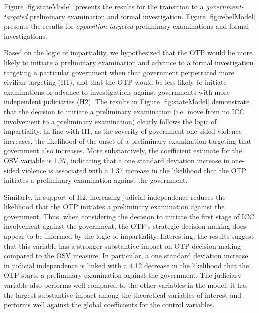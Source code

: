 Figure \ref{fig:stateModel} presents the results for the transition to a \textit{government-targeted} preliminary examination and formal investigation. Figure \ref{fig:rebelModel} presents the results for \textit{opposition-targeted} preliminary examinations and formal investigations.

Based on the logic of impartiality, we hypothesized that the OTP would be more likely to initiate a preliminary examination and advance to a formal investigation targeting a particular government when that government perpetrated more civilian targeting (H1), and that the OTP would be less likely to initiate examinations or advance to investigations against governments with more independent judiciaries (H2). The results in Figure \ref{fig:stateModel} demonstrate that the decision to initiate a preliminary examination (i.e. move from no ICC involvement to a preliminary examination) clearly follows the logic of impartiality. In line with H1, as the severity of government one-sided violence increases, the likelihood of the onset of a preliminary examination targeting that government also increases.  More substantively, the coefficient estimate for the OSV variable is 1.37, indicating that a one standard deviation increase in one-sided violence is associated with a 1.37 increase in the likelihood that the OTP initiates a preliminary examination against the government.

Similarly, in support of H2, increasing judicial independence reduces the likelihood that the OTP initiates a preliminary examination against the government. Thus, when considering the decision to initiate the first stage of ICC involvement against the government, the OTP's strategic decision-making does appear to be informed by the logic of impartiality. Interesting, the results suggest that this variable has a stronger substantive impact on OTP decision-making compared to the OSV measure. In particular, a one standard deviation increase in judicial independence is linked with a 4.12 decrease in the likelihood that the OTP starts a preliminary examination against the government. The judiciary variable also performs well compared to the other variables in the model; it has the largest substantive impact among the theoretical variables of interest and performs well against the global coefficients for the control variables.

